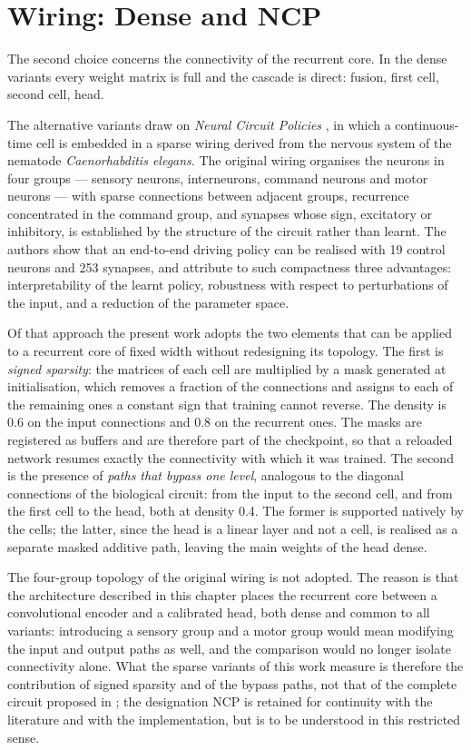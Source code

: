 \section{Wiring: Dense and NCP}
\label{sec:lnn-wiring}

The second choice concerns the connectivity of the recurrent core. In the dense
variants every weight matrix is full and the cascade is direct: fusion, first
cell, second cell, head.

The alternative variants draw on \emph{Neural Circuit Policies}
\cite{lechner2020ncp}, in which a continuous-time cell is embedded in a sparse
wiring derived from the nervous system of the nematode \emph{Caenorhabditis
elegans}. The original wiring organises the neurons in four groups ---
sensory neurons, interneurons, command neurons and motor neurons --- with sparse
connections between adjacent groups, recurrence concentrated in the command
group, and synapses whose sign, excitatory or inhibitory, is established by the
structure of the circuit rather than learnt. The authors show that an end-to-end
driving policy can be realised with \num{19} control neurons and \num{253}
synapses, and attribute to such compactness three advantages: interpretability
of the learnt policy, robustness with respect to perturbations of the input, and
a reduction of the parameter space.

Of that approach the present work adopts the two elements that can be applied to
a recurrent core of fixed width without redesigning its topology. The first is
\emph{signed sparsity}: the matrices of each cell are multiplied by a mask
generated at initialisation, which removes a fraction of the connections and
assigns to each of the remaining ones a constant sign that training cannot
reverse. The density is \num{0.6} on the input connections and \num{0.8} on the
recurrent ones. The masks are registered as buffers and are therefore part of
the checkpoint, so that a reloaded network resumes exactly the connectivity with
which it was trained. The second is the presence of \emph{paths that bypass one
level}, analogous to the diagonal connections of the biological circuit: from
the input to the second cell, and from the first cell to the head, both at
density \num{0.4}. The former is supported natively by the cells; the latter,
since the head is a linear layer and not a cell, is realised as a separate
masked additive path, leaving the main weights of the head dense.

The four-group topology of the original wiring is not adopted. The reason is
that the architecture described in this chapter places the recurrent core
between a convolutional encoder and a calibrated head, both dense and common to
all variants: introducing a sensory group and a motor group would mean modifying
the input and output paths as well, and the comparison would no longer isolate
connectivity alone. What the sparse variants of this work measure is therefore
the contribution of signed sparsity and of the bypass paths, not that of the
complete circuit proposed in \cite{lechner2020ncp}; the designation NCP is
retained for continuity with the literature and with the implementation, but is
to be understood in this restricted sense.

